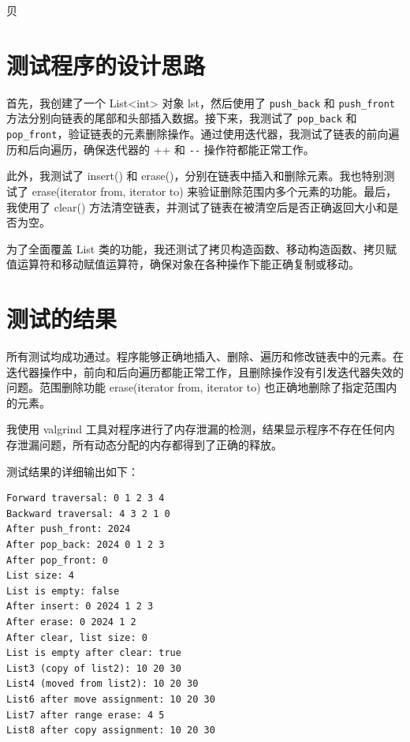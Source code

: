 贝\documentclass[UTF8]{ctexart}
\begin{document}
\pagestyle{fancy}
\fancyhead{}

\section{测试程序的设计思路}

首先，我创建了一个 List<int> 对象 lst，然后使用了 \verb|push_back| 和 \verb|push_front| 方法分别向链表的尾部和头部插入数据。接下来，我测试了 \verb|pop_back| 和 \verb|pop_front|，验证链表的元素删除操作。通过使用迭代器，我测试了链表的前向遍历和后向遍历，确保迭代器的 ++ 和 \verb|--| 操作符都能正常工作。

此外，我测试了 insert() 和 erase()，分别在链表中插入和删除元素。我也特别测试了 erase(iterator from, iterator to) 来验证删除范围内多个元素的功能。最后，我使用了 clear() 方法清空链表，并测试了链表在被清空后是否正确返回大小和是否为空。

为了全面覆盖 List 类的功能，我还测试了拷贝构造函数、移动构造函数、拷贝赋值运算符和移动赋值运算符，确保对象在各种操作下能正确复制或移动。

\section{测试的结果}

所有测试均成功通过。程序能够正确地插入、删除、遍历和修改链表中的元素。在迭代器操作中，前向和后向遍历都能正常工作，且删除操作没有引发迭代器失效的问题。范围删除功能 erase(iterator from, iterator to) 也正确地删除了指定范围内的元素。

我使用 valgrind 工具对程序进行了内存泄漏的检测，结果显示程序不存在任何内存泄漏问题，所有动态分配的内存都得到了正确的释放。

测试结果的详细输出如下：
\begin{verbatim}
Forward traversal: 0 1 2 3 4 
Backward traversal: 4 3 2 1 0 
After push_front: 2024
After pop_back: 2024 0 1 2 3 
After pop_front: 0
List size: 4
List is empty: false
After insert: 0 2024 1 2 3 
After erase: 0 2024 1 2 
After clear, list size: 0
List is empty after clear: true
List3 (copy of list2): 10 20 30 
List4 (moved from list2): 10 20 30 
List6 after move assignment: 10 20 30 
List7 after range erase: 4 5 
List8 after copy assignment: 10 20 30 
\end{verbatim}
\end{document}
